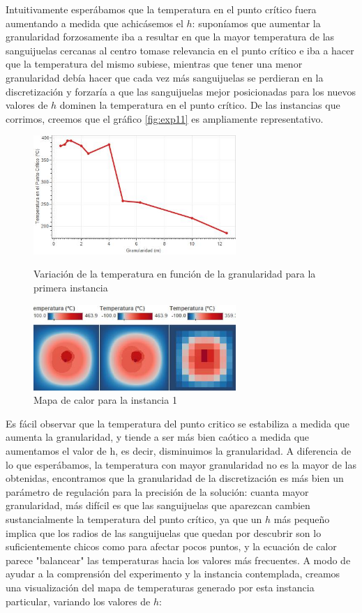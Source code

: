 Intuitivamente esperábamos que la temperatura en el punto crítico fuera aumentando a medida que achicásemos el $h$: suponíamos que aumentar la granularidad forzosamente iba a resultar en que la mayor temperatura de las sanguijuelas cercanas al centro tomase relevancia en el punto crítico e iba a hacer que la temperatura del mismo subiese, mientras que tener una menor granularidad debía hacer que cada vez más sanguijuelas se perdieran en la discretización y forzaría a que las sanguijuelas mejor posicionadas para los nuevos valores de $h$ dominen la temperatura en el punto crítico. De las instancias que corrimos, creemos que el gráfico \ref{fig:exp11} es ampliamente representativo.

\begin{figure}[b]
    \centering
    \includegraphics[width=0.685\textwidth]{experimento 1-1}
    \caption{Variación de la temperatura en función de la granularidad para la primera instancia}
    \label{fig:exp11}
    
    \includegraphics[width=0.685\textwidth]{Ejemplo Instancia 1}
    \caption{Mapa de calor para la instancia 1}
    \label{fig:exp11-vis}
\end{figure}

Es fácil observar que la temperatura del punto critico se estabiliza a medida que aumenta la granularidad, y tiende a ser más bien caótico a medida que aumentamos el valor de h, es decir, disminuimos la granularidad. A diferencia de lo que esperábamos, la temperatura con mayor granularidad no es la mayor de las obtenidas, encontramos que la granularidad de la discretización es más bien un parámetro de regulación para la precisión de la solución: cuanta mayor granularidad, más difícil es que las sanguijuelas que aparezcan cambien sustancialmente la temperatura del punto crítico, ya que un $h$ más pequeño implica que los radios de las sanguijuelas que quedan por descubrir son lo suficientemente chicos como para afectar pocos puntos, y la ecuación de calor parece "balancear" las temperaturas hacia los valores más frecuentes. A modo de ayudar a la comprensión del experimento y la instancia contemplada, creamos una visualización del mapa de temperaturas generado por esta instancia particular, variando los valores de $h$:

